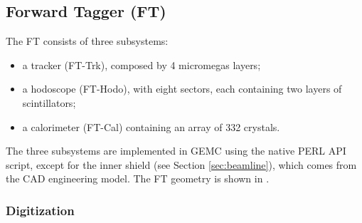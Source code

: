 \subsection{Forward Tagger (FT)}

The FT consists of three subsystems:

\begin{itemize}
	\item a tracker (FT-Trk), composed by 4 micromegas layers;
	\item a hodoscope (FT-Hodo), with eight sectors, each containing two layers of scintillators;
 	\item a calorimeter (FT-Cal) containing an array of 332 crystals.
\end{itemize}

The three subsystems are implemented in GEMC using the native PERL API script, except for the inner shield (see
Section \ref{sec:beamline}), which comes from the CAD engineering model. The FT geometry is shown in .

\subsubsection{Digitization}

